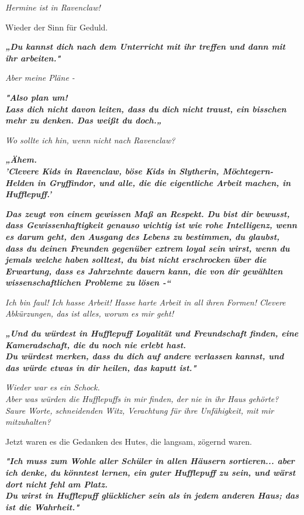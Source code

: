{\emph{Hermine ist in Ravenclaw!}

Wieder der Sinn für Geduld.

\textbf{\emph{„Du kannst dich nach dem Unterricht mit ihr treffen und dann mit ihr arbeiten."}}

\emph{Aber meine Pläne -}

\textbf{\emph{"Also plan um!}}\\ \textbf{\emph{Lass dich nicht davon leiten, dass du dich nicht traust, ein bisschen mehr zu denken. Das weißt du doch.„}}

\emph{Wo sollte ich hin, wenn nicht nach Ravenclaw?}

\textbf{\emph{„Ähem.\\ 'Clevere Kids in Ravenclaw, böse Kids in Slytherin, Möchtegern-Helden in Gryffindor, und alle, die die eigentliche Arbeit machen, in Hufflepuff.'}}

\textbf{\emph{Das zeugt von einem gewissen Maß an Respekt. Du bist dir bewusst, dass Gewissenhaftigkeit genauso wichtig ist wie rohe Intelligenz, wenn es darum geht, den Ausgang des Lebens zu bestimmen, du glaubst, dass du deinen Freunden gegenüber extrem loyal sein wirst, wenn du jemals welche haben solltest, du bist nicht erschrocken über die Erwartung, dass es Jahrzehnte dauern kann, die von dir gewählten wissenschaftlichen Probleme zu lösen -“}}

\emph{Ich bin faul! Ich hasse Arbeit! Hasse harte Arbeit in all ihren Formen! Clevere Abkürzungen, das ist alles, worum es mir geht!}

\textbf{\emph{„Und du würdest in Hufflepuff Loyalität und Freundschaft finden, eine Kameradschaft, die du noch nie erlebt hast.\\ Du würdest merken, dass du dich auf andere verlassen kannst, und das würde etwas in dir heilen, das kaputt ist."}}

\emph{Wieder war es ein Schock.\\ Aber was würden die Hufflepuffs in mir finden, der nie in ihr Haus gehörte? Saure Worte, schneidenden Witz, Verachtung für ihre Unfähigkeit, mit mir mitzuhalten?}

Jetzt waren es die Gedanken des Hutes, die langsam, zögernd waren.

\textbf{\emph{"Ich muss zum Wohle aller Schüler in allen Häusern sortieren... aber ich denke, du könntest lernen, ein guter Hufflepuff zu sein, und wärst dort nicht fehl am Platz.\\ Du wirst in Hufflepuff glücklicher sein als in jedem anderen Haus; das ist die Wahrheit."}}

}
